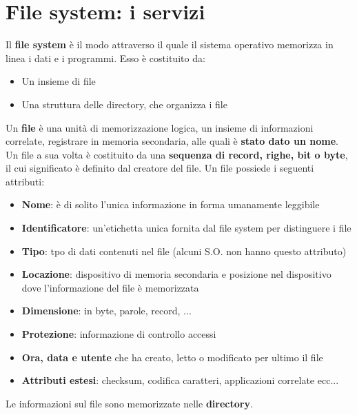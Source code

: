 \documentclass[12pt]{article}
\begin{document}
\section{File system: i servizi}
Il \textbf{file system} è il modo attraverso il quale il sistema operativo memorizza in linea i dati e i programmi.
Esso è costituito da:
\begin{itemize}
    \item Un insieme di file
    \item Una struttura delle directory, che organizza i file
\end{itemize}
Un \textbf{file} è una unità di memorizzazione logica, un insieme di informazioni correlate, registrare in memoria secondaria, alle quali è \textbf{stato dato un nome}.
Un file a sua volta è costituito da una \textbf{sequenza di record, righe, bit o byte}, il cui significato è definito dal creatore del file.
Un file possiede i seguenti attributi:
\begin{itemize}
    \item \textbf{Nome}: è di solito l'unica informazione in forma umanamente leggibile
    \item \textbf{Identificatore}: un'etichetta unica fornita dal file system per distinguere i file
    \item \textbf{Tipo}: tpo di dati contenuti nel file (alcuni S.O. non hanno questo attributo)
    \item \textbf{Locazione}: dispositivo di memoria secondaria e posizione nel dispositivo dove l'informazione del file è memorizzata
    \item \textbf{Dimensione}: in byte, parole, record, ...
    \item \textbf{Protezione}: informazione di controllo accessi
    \item \textbf{Ora, data e utente} che ha creato, letto o modificato per ultimo il file
    \item \textbf{Attributi estesi}: checksum, codifica caratteri, applicazioni correlate ecc...
\end{itemize}
Le informazioni sul file sono memorizzate nelle \textbf{directory}.
\end{document}

